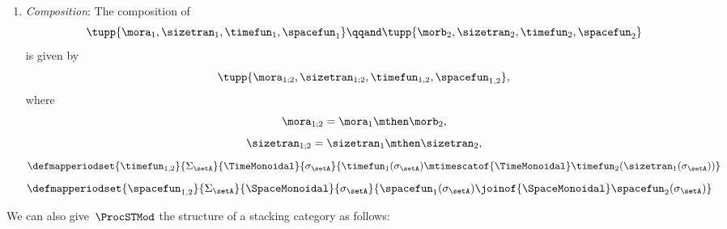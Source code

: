 \begin{definition}
\begin{enumerate}
        \item \emph{Composition}: The composition of
              \begin{equation}
                  \tupp{\mora_1, \sizetran_1,  \timefun_1, \spacefun_1 }
                  \qqand
                  \tupp{\morb_2, \sizetran_2,  \timefun_2, \spacefun_2 }
              \end{equation}
              is given by
              \begin{equation}
                  \tupp{
                      \mora_{1;2},
                      \sizetran_{1;2},
                      \timefun_{1,2},
                      \spacefun_{1,2}
                  },
              \end{equation}
              where
              \begin{equation}
                  \mora_{1;2} = \mora_1 \mthen \morb_2,
              \end{equation}
              \begin{equation}
                  \sizetran_{1;2} = \sizetran_1 \mthen \sizetran_2,
              \end{equation}
              \begin{equation}
                  \defmapperiodset{
                      \timefun_{1,2}
                  }{
                      \Sigma_{\setA}
                  }{
                      \TimeMonoidal
                  }{
                      \sigma_{\setA}
                  }{
                      \timefun_1(\sigma_{\setA}) \mtimescatof{\TimeMonoidal} \timefun_2(\sizetran_1(\sigma_{\setA}))
                  }
              \end{equation}
              \begin{equation}
                  \defmapperiodset{
                      \spacefun_{1,2}
                  }{
                      \Sigma_{\setA}
                  }{
                      \SpaceMonoidal
                  }{
                      \sigma_{\setA}
                  }{
                      \spacefun_1(\sigma_{\setA}) \joinof{\SpaceMonoidal} \spacefun_2(\sigma_{\setA})
                  }
              \end{equation}
    \end{enumerate}
\end{definition}

We can also give~$\ProcSTMod$ the structure of a stacking category as follows:

